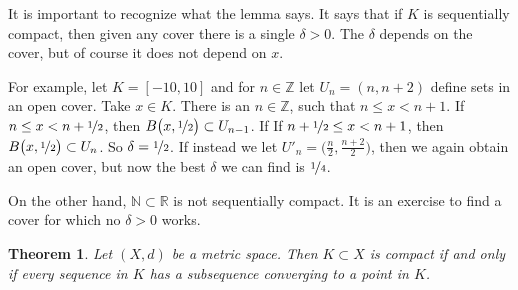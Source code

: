 \documentclass[12pt,openany]{book}
\newcommand{\R}{{\mathbb{R}}}
\newcommand{\Z}{{\mathbb{Z}}}
\newcommand{\N}{{\mathbb{N}}}
\theoremstyle{plain}
\newtheorem{thm}{Theorem}[section]
\theoremstyle{remark}
\theoremstyle{definition}
\theoremstyle{exercise}
\theoremstyle{example}
\begin{document}
It is important to recognize what the lemma says.  It says that
if $K$ is sequentially compact, then given any
cover there is a single $\delta > 0$.  The $\delta$ depends on the cover,
but of course it does not depend on $x$.

For example, let $K = [-10,10]$ and for $n \in \Z$ let $U_n =
(n,n+2)$ define sets in an open cover.
Take $x \in K$. There is an $n \in \Z$, 
such that $n \leq x < n+1$.
If $n \leq x < n+\nicefrac{1}{2}$, then
$B\bigl(x,\nicefrac{1}{2}\bigr) \subset U_{n-1}$.  If
If $n+ \nicefrac{1}{2} \leq x < n+1$, then
$B\bigl(x,\nicefrac{1}{2}\bigr) \subset U_{n}$.  So $\delta =
\nicefrac{1}{2}$.  If instead we let $U'_n =
\bigl(\frac{n}{2},\frac{n+2}{2} \bigr)$, then we again obtain an open
cover, but now the best $\delta$ we can find is $\nicefrac{1}{4}$.

On the other hand, $\N \subset \R$ is not sequentially compact.
It is an exercise to find a cover for which no $\delta > 0$ works.


\begin{thm} \label{thm:mscompactisseqcpt}
Let $(X,d)$ be a metric space.  Then $K \subset X$ is compact if
and only if every sequence in $K$ has a subsequence converging to
a point in $K$.
\end{thm}
\end{document}
